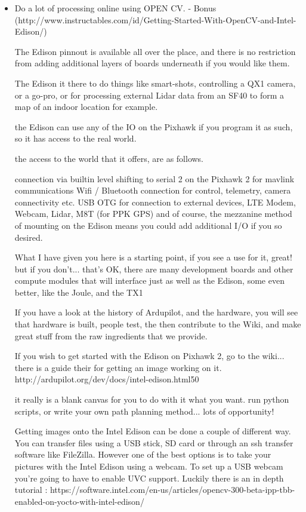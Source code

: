 \documentclass[12pt]{report}
\begin{document}
\begin{itemize}
\item Do a lot of processing online using OPEN CV.                     -               Bonus
\\(http://www.instructables.com/id/Getting-Started-With-OpenCV-and-Intel-Edison/)

The Edison pinnout is available all over the place, and there is no restriction from adding additional layers of boards underneath if you would like them.

The Edison it there to do things like smart-shots, controlling a QX1 camera, or a go-pro, or for processing external Lidar data from an SF40 to form a map of an indoor location for example.

the Edison can use any of the IO on the Pixhawk if you program it as such, so it has access to the real world.

the access to the world that it offers, are as follows.

connection via builtin level shifting to serial 2 on the Pixhawk 2 for mavlink communications
Wifi / Bluetooth connection for control, telemetry, camera connectivity etc.
USB OTG for connection to external devices, LTE Modem, Webcam, Lidar, M8T (for PPK GPS)
and of course, the mezzanine method of mounting on the Edison means you could add additional I/O if you so desired.

What I have given you here is a starting point, if you see a use for it, great! but if you don't... that's OK, there are many development boards and other compute modules that will interface just as well as the Edison, some even better, like the Joule, and the TX1

If you have a look at the history of Ardupilot, and the hardware, you will see that hardware is built, people test, the then contribute to the Wiki, and make great stuff from the raw ingredients that we provide.

If you wish to get started with the Edison on Pixhawk 2, go to the wiki... there is a guide their for getting an image working on it.
http://ardupilot.org/dev/docs/intel-edison.html50

it really is a blank canvas for you to do with it what you want. run python scripts, or write your own path planning method... lots of opportunity!

Getting images onto the Intel Edison can be done a couple of different way. You can transfer files using a USB stick, SD card or through an ssh transfer software like FileZilla. However one of the best options is 
to take your pictures with the Intel Edison using a webcam. 
To set up a USB webcam you're going to have to enable UVC support. Luckily there is an in depth tutorial : https://software.intel.com/en-us/articles/opencv-300-beta-ipp-tbb-enabled-on-yocto-with-intel-edison/


\end{itemize}
\end{document}

